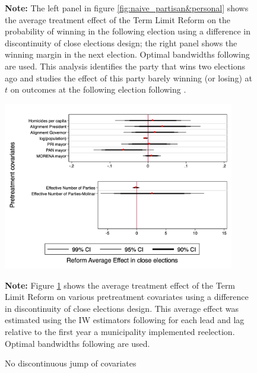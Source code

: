 \documentclass[12pt]{amsart}
\numberwithin{equation}{section}
\theoremstyle{definition}
\theoremstyle{definition}
\theoremstyle{definition}
\begin{document}
\begin{appendix}
\begin{figure}[h]
  \textbf{Note:} The left panel in figure \ref{fig:naive_partisan&personal} shows the average treatment effect of the Term Limit Reform on the probability of winning in the following election using a difference in discontinuity of close elections design; the right panel shows the winning margin in the next election. Optimal bandwidths following \citet{calonicoetal_2014} are used. This analysis identifies the party that wins two elections ago and studies the effect of this party barely winning (or losing) at $t$ on outcomes at the following election following \citet{klasnja_titiunik_2017}.  
\end{figure} 
       



 \begin{figure}[h]   
\centering
 \caption{No discontinuous jump of covariates}
 \label{fig:jump_covariates}
\includegraphics[width=0.9\textwidth]{../Figures/nojump.png}
       \captionsetup{justification=centering}
    
 \textbf{Note:} Figure \ref{fig:jump_covariates} shows the average treatment effect of the Term Limit Reform on various pretreatment covariates using a difference in discontinuity of close elections design. This average effect was estimated using the IW estimators following \citet{abraham_sun_2020} for each lead and lag relative to the first year a municipality implemented reelection. Optimal bandwidths following \citet{calonicoetal_2014} are used. 
   
\end{figure} 


    
    

\end{appendix}
\end{document}
